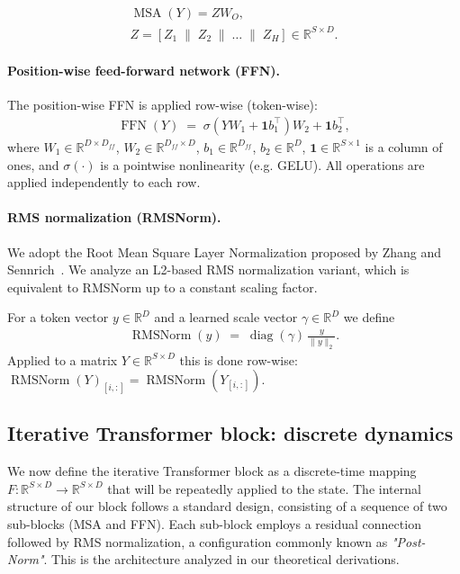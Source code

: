\documentclass{zapiski}
\theoremstyle{plain}
\theoremstyle{definition}
\theoremstyle{remark}
\begin{document}
\begin{equation}
\begin{gathered}
\operatorname{MSA}(Y) = Z W_O, \\
Z=[Z_1\;\|\;Z_2\;\|\;\dots\;\|\;Z_H]\in\mathbb{R}^{S\times D}.
\end{gathered}
\end{equation}

\paragraph{Position-wise feed-forward network (FFN).}
\label{sssec:ffn}

The position-wise FFN is applied row-wise (token-wise):
\begin{align}
\operatorname{FFN}(Y) \;=\; \sigma( Y W_1 + \mathbf{1} b_1^\top ) W_2 + \mathbf{1} b_2^\top,
\end{align}
where $W_1\in\mathbb{R}^{D\times D_{ff}}$, $W_2\in\mathbb{R}^{D_{ff}\times D}$, $b_1\in\mathbb{R}^{D_{ff}}$,
$b_2\in\mathbb{R}^{D}$, $\mathbf{1}\in\mathbb{R}^{S\times 1}$ is a column of ones, and
$\sigma(\cdot)$ is a pointwise nonlinearity (e.g. GELU). All operations are applied independently to each row.

\paragraph{RMS normalization (RMSNorm).}
\label{sssec:rms}

We adopt the Root Mean Square Layer Normalization proposed by Zhang and Sennrich~\cite{zhang2019root}. We analyze an L2-based RMS normalization variant, which is equivalent to RMSNorm up to a constant scaling factor.

For a token vector $y\in\mathbb{R}^D$ and a learned scale vector $\gamma\in\mathbb{R}^D$ we define
\begin{align}
\operatorname{RMSNorm}(y) \;=\; \operatorname{diag}(\gamma)\, \frac{y}{\|y\|_2}.
\end{align}
Applied to a matrix $Y\in\mathbb{R}^{S\times D}$ this is done row-wise:
$\operatorname{RMSNorm}(Y)_{[i,:]} = \operatorname{RMSNorm}(Y_{[i,:]})$.

\subsection{Iterative Transformer block: discrete dynamics}
\label{ssec:itr_block}

We now define the iterative Transformer block as a discrete-time mapping $F:\mathbb{R}^{S\times D}\to\mathbb{R}^{S\times D}$ that will be repeatedly applied to the state. The internal structure of our block follows a standard design, consisting of a sequence of two sub-blocks (MSA and FFN). Each sub-block employs a residual connection followed by RMS normalization, a configuration commonly known as \textit{"Post-Norm"}. This is the architecture analyzed in our theoretical derivations.
\end{document}
